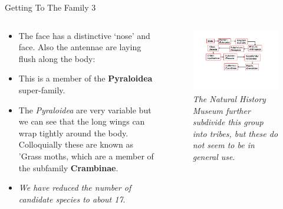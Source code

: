 \documentclass[
  ignorenonframetext,
]{beamer}
\providecommand{\tightlist}{%
  \setlength{\itemsep}{0pt}\setlength{\parskip}{0pt}}
\begin{document}
\begin{frame}{Getting To The Family 3}
\protect\hypertarget{getting-to-the-family-3}{}
\begin{columns}[T]
\begin{column}{0.5\textwidth}
\begin{itemize}
\tightlist
\item
  The face has a distinctive `nose' and face. Also the antennae are
  laying flush along the body:
\item
  This is a member of the \textbf{Pyraloidea} super-family.
\item
  The \emph{Pyraloidea} are very variable but we can see that the long
  wings can wrap tightly around the body. Colloquially these are known
  as 'Grass moths, which are a member of the subfamily
  \textbf{Crambinae}.
\item
  \emph{We have reduced the number of candidate species to about 17}.
\end{itemize}
\end{column}

\begin{column}{0.5\textwidth}
\begin{figure}
\centering
\includegraphics{./images/subfamily.jpg}
\caption{\emph{The Natural History Museum further subdivide this group
into tribes, but these do not seem to be in general use}.}
\end{figure}
\end{column}
\end{columns}
\end{frame}
\end{document}
